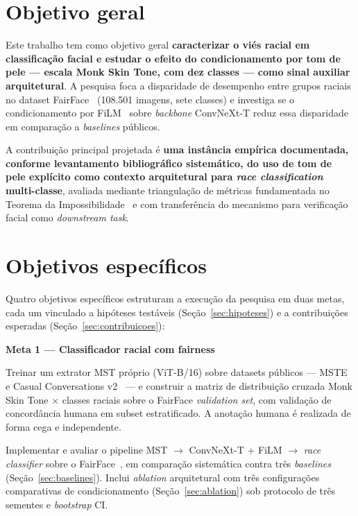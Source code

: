 \section{Objetivo geral}
\label{sec:obj_geral}

Este trabalho tem como objetivo geral \textbf{caracterizar o viés racial em classificação facial e estudar o efeito do condicionamento por tom de pele --- escala Monk Skin Tone, com dez classes --- como sinal auxiliar arquitetural}. A pesquisa foca a disparidade de desempenho entre grupos raciais no dataset FairFace~\cite{karkkainen2021fairface} (108.501 imagens, sete classes) e investiga se o condicionamento por FiLM~\cite{perez2018film} sobre \emph{backbone} ConvNeXt-T reduz essa disparidade em comparação a \emph{baselines} públicos.

A contribuição principal projetada é \textbf{uma instância empírica documentada, conforme levantamento bibliográfico sistemático, do uso de tom de pele explícito como contexto arquitetural para \emph{race classification} multi-classe}, avaliada mediante triangulação de métricas fundamentada no Teorema da Impossibilidade~\cite{kleinberg2017inherent} e com transferência do mecanismo para verificação facial como \emph{downstream task}.

\section{Objetivos específicos}
\label{sec:obj_especificos}

Quatro objetivos específicos estruturam a execução da pesquisa em duas metas, cada um vinculado a hipóteses testáveis (Seção~\ref{sec:hipoteses}) e a contribuições esperadas (Seção~\ref{sec:contribuicoes}):

\textbf{Meta 1 — Classificador racial com fairness}

\begin{description}[font=\bfseries\sffamily]
\item[Objetivo 1.] Treinar um extrator MST próprio (ViT-B/16) sobre datasets públicos --- MSTE~\cite{monk2019scale} e Casual Conversations v2~\cite{porgali2023casual} --- e construir a matriz de distribuição cruzada Monk Skin Tone $\times$ classes raciais sobre o FairFace \emph{validation set}, com validação de concordância humana em subset estratificado. A anotação humana é realizada de forma cega e independente.

\item[Objetivo 2.] Implementar e avaliar o pipeline MST $\rightarrow$ ConvNeXt-T + FiLM $\rightarrow$ \emph{race classifier} sobre o FairFace~\cite{karkkainen2021fairface}, em comparação sistemática contra três \emph{baselines} (Seção~\ref{sec:baselines}). Inclui \emph{ablation} arquitetural com três configurações comparativas de condicionamento (Seção~\ref{sec:ablation}) sob protocolo de três sementes e \emph{bootstrap} CI.
\end{description}

